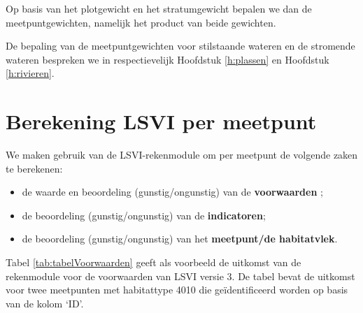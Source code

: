 \documentclass[twoside]{extreport}
\begin{document}
Op basis van het plotgewicht en het stratumgewicht bepalen we dan de
meetpuntgewichten, namelijk het product van beide gewichten.

De bepaling van de meetpuntgewichten voor stilstaande wateren en de
stromende wateren bespreken we in respectievelijk Hoofdstuk
\ref{h:plassen} en Hoofdstuk \ref{h:rivieren}.

\section{Berekening LSVI per
meetpunt}\label{berekening-lsvi-per-meetpunt}

We maken gebruik van de LSVI-rekenmodule om per meetpunt de volgende
zaken te berekenen:

\begin{itemize}
\tightlist
\item
  de waarde en beoordeling (gunstig/ongunstig) van de
  \textbf{voorwaarden} ;
\item
  de beoordeling (gunstig/ongunstig) van de \textbf{indicatoren};
\item
  de beoordeling (gunstig/ongunstig) van het \textbf{meetpunt/de
  habitatvlek}.
\end{itemize}

Tabel \ref{tab:tabelVoorwaarden} geeft als voorbeeld de uitkomst van de
rekenmodule voor de voorwaarden van LSVI versie 3. De tabel bevat de
uitkomst voor twee meetpunten met habitattype 4010 die geïdentificeerd
worden op basis van de kolom `ID'.
\end{document}
